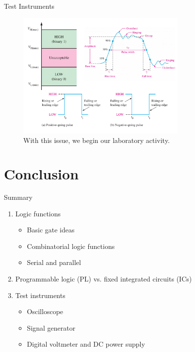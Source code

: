 \documentclass{beamer}
\begin{document}
\begin{frame}{Test Instruments}
\begin{figure}
\includegraphics[width=0.75\textwidth]{digital1.pdf}
\caption{\label{fig:digital1} With this issue, we begin our laboratory activity.}
\end{figure}
\end{frame}

\section{Conclusion}

\begin{frame}{Summary}
\begin{enumerate}
\item Logic functions
\begin{itemize}
\item Basic gate ideas
\item Combinatorial logic functions
\item Serial and parallel
\end{itemize}
\item Programmable logic (PL) vs. fixed integrated circuits (ICs)
\item Test instruments
\begin{itemize}
\item Oscilloscope
\item Signal generator
\item Digital voltmeter and DC power supply
\end{itemize}
\end{enumerate}
\end{frame}
\end{document}
